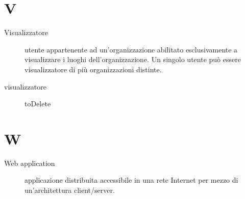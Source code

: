 \documentclass{article}
\begin{document}
	\section{V}
	\begin{description}
		\item[Visualizzatore] utente appartenente ad un'organizzazione abilitato esclusivamente a visualizzare i luoghi dell'organizzazione. Un singolo utente può essere visualizzatore di più organizzazioni distinte.
		\item[visualizzatore] toDelete
	\end{description}
	\section{W}
	\begin{description}
		\item[Web application] applicazione distribuita accessibile in una rete Internet per mezzo di un'architettura client/server.
	\end{description}
\end{document}

